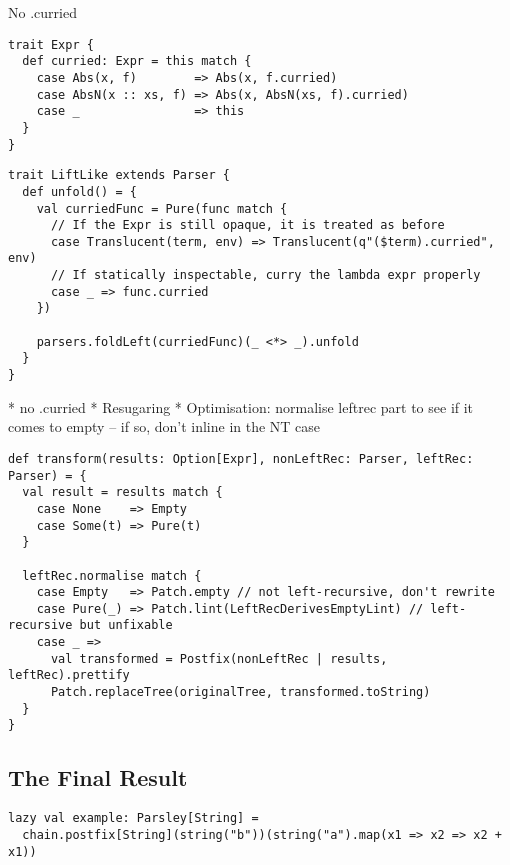 \documentclass[../../main.tex]{subfiles}
\begin{document}
No .curried
\begin{verbatim}
trait Expr {
  def curried: Expr = this match {
    case Abs(x, f)        => Abs(x, f.curried)
    case AbsN(x :: xs, f) => Abs(x, AbsN(xs, f).curried)
    case _                => this
  }
}
\end{verbatim}

\begin{verbatim}
trait LiftLike extends Parser {
  def unfold() = {
    val curriedFunc = Pure(func match {
      // If the Expr is still opaque, it is treated as before
      case Translucent(term, env) => Translucent(q"($term).curried", env)
      // If statically inspectable, curry the lambda expr properly
      case _ => func.curried
    })

    parsers.foldLeft(curriedFunc)(_ <*> _).unfold
  }
}
\end{verbatim}

* no .curried
* Resugaring
* Optimisation: normalise leftrec part to see if it comes to empty -- if so, don't inline in the NT case

\begin{verbatim}
def transform(results: Option[Expr], nonLeftRec: Parser, leftRec: Parser) = {
  val result = results match {
    case None    => Empty
    case Some(t) => Pure(t)
  }

  leftRec.normalise match {
    case Empty   => Patch.empty // not left-recursive, don't rewrite
    case Pure(_) => Patch.lint(LeftRecDerivesEmptyLint) // left-recursive but unfixable
    case _ =>
      val transformed = Postfix(nonLeftRec | results, leftRec).prettify
      Patch.replaceTree(originalTree, transformed.toString)
  }
}
\end{verbatim}



\subsection*{The Final Result}
\begin{verbatim}
lazy val example: Parsley[String] =
  chain.postfix[String](string("b"))(string("a").map(x1 => x2 => x2 + x1))
\end{verbatim}
\end{document}
